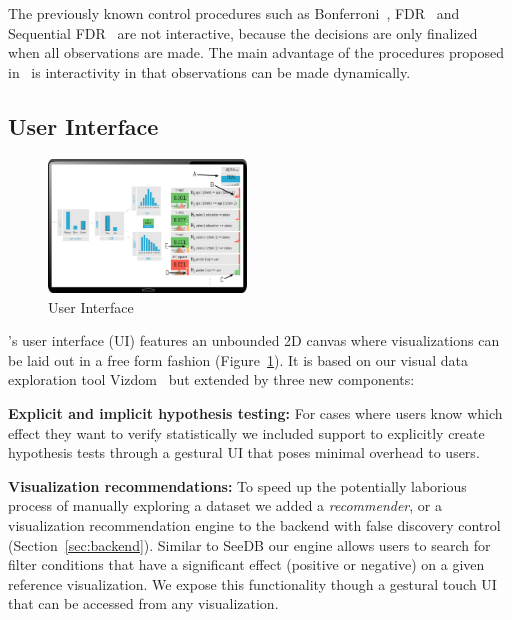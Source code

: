 The previously known control procedures such as Bonferroni~\cite{bonferroni1936teoria}, FDR~\cite{BenjaminiH95} and Sequential FDR~\cite{g2016sequential} are not interactive, because the decisions are only finalized when all observations are made.  The main advantage of the \ainv{} procedures proposed in~\cite{zhao2016controlling} is interactivity in that observations can be made dynamically.

\subsection{User Interface}
\label{sec:ui}

\begin{figure}
\centering
\includegraphics[width=0.47\textwidth]{figures/ui.pdf}
\caption{User Interface}
\label{fig:ui}	
\end{figure}

\system{}'s user interface (UI) features an unbounded 2D canvas where visualizations can be laid out in a free form fashion (Figure~\ref{fig:ui}). It is based on our visual data exploration tool Vizdom~\cite{vizdom} but extended by three new components:

\textbf{Explicit and implicit hypothesis testing:} For cases where users know which effect they want to verify statistically we included support to explicitly create hypothesis tests through a gestural UI that poses minimal overhead to users.
 
\textbf{Visualization recommendations:} To speed up the potentially laborious process of manually exploring a dataset we added a \textit{recommender}, or a visualization recommendation engine to the backend with false discovery control (Section~\ref{sec:backend}). Similar to SeeDB \cite{seedb} our engine allows users to search for filter conditions that have a significant effect (positive or negative) on a given reference visualization. We expose this functionality though a gestural touch UI that can be accessed from any visualization. 

